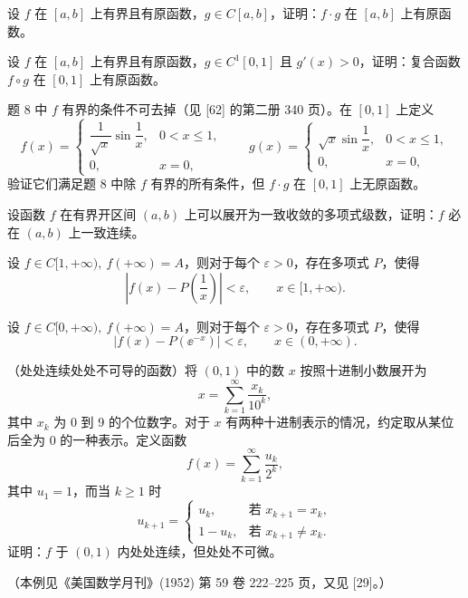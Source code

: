 \begin{xreferenceproblem}[8]
设 $f$ 在 $[a,b]$ 上有界且有原函数，$g\in C[a,b]$，证明：$f\cdot g$ 在 $[a,b]$ 上有原函数。
\end{xreferenceproblem}

\begin{xreferenceproblem}[9]
设 $f$ 在 $[a,b]$ 上有界且有原函数，$g\in C^1[0,1]$ 且 $g'(x)>0$，证明：复合函数 $f\circ g$ 在 $[0,1]$ 上有原函数。
\end{xreferenceproblem}

\begin{xreferenceproblem}[10]
题 8 中 $f$ 有界的条件不可去掉（见 [62] 的第二册 340 页）。在 $[0,1]$ 上定义
\[
  f(x)=
  \begin{cases}
    \dfrac1{\sqrt x}\sin\dfrac1x,&0<x\leqslant1,\\
    0,&x=0,
  \end{cases}
  \qquad
  g(x)=
  \begin{cases}
    \sqrt x\sin\dfrac1x,&0<x\leqslant1,\\
    0,&x=0,
  \end{cases}
\]
验证它们满足题 8 中除 $f$ 有界的所有条件，但 $f\cdot g$ 在 $[0,1]$ 上无原函数。
\end{xreferenceproblem}

\begin{xreferenceproblem}[11]
设函数 $f$ 在有界开区间 $(a,b)$ 上可以展开为一致收敛的多项式级数，证明：$f$ 必在 $(a,b)$ 上一致连续。
\end{xreferenceproblem}

\begin{xreferenceproblem}[12]
设 $f\in C[1,+\infty),\ f(+\infty)=A$，则对于每个 $\varepsilon>0$，存在多项式 $P$，使得
\[
  \left|f(x)-P\left(\frac1x\right)\right|<\varepsilon,\qquad x\in[1,+\infty).
\]
\end{xreferenceproblem}

\begin{xreferenceproblem}[13]
设 $f\in C[0,+\infty),\ f(+\infty)=A$，则对于每个 $\varepsilon>0$，存在多项式 $P$，使得
\[
  |f(x)-P(\ee^{-x})|<\varepsilon,\qquad x\in(0,+\infty).
\]
\end{xreferenceproblem}

\begin{xreferenceproblem}[14]
（处处连续处处不可导的函数）将 $(0,1)$ 中的数 $x$ 按照十进制小数展开为
\[
  x=\sum_{k=1}^{\infty}\frac{x_k}{10^k},
\]
其中 $x_k$ 为 0 到 9 的个位数字。对于 $x$ 有两种十进制表示的情况，约定取从某位后全为 0 的一种表示。定义函数
\[
  f(x)=\sum_{k=1}^{\infty}\frac{u_k}{2^k},
\]
其中 $u_1=1$，而当 $k\geqslant1$ 时
\[
  u_{k+1}=
  \begin{cases}
    u_k,&\text{若 }x_{k+1}=x_k,\\
    1-u_k,&\text{若 }x_{k+1}\ne x_k.
  \end{cases}
\]
证明：$f$ 于 $(0,1)$ 内处处连续，但处处不可微。

（本例见《美国数学月刊》(1952) 第 59 卷 222--225 页，又见 [29]。）
\end{xreferenceproblem}

